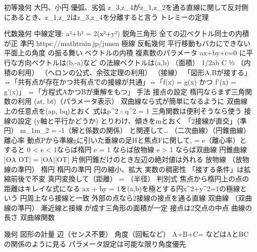 \documentclass[dvipdfmx,uplatex]{jsarticle}
\begin{document}
初等幾何
大円、小円
優弧、劣弧
z_3,z_4がz_1,z_2を通る直線に関して反対側にあるとき、z_1,z_2はz_3,z_4を分離すると言う
トレミーの定理

代数幾何
中線定理: a²+b² = 2(x²+y²)
鋭角三角形
全ての辺ベクトル同士の内積が正
準円
https://mathtrain.jp/junen
極線
反転幾何
平行移動もバカにできない
平面上の角度
\tan の振る舞い
ベクトルの内積
複素数のパラメータ
ax+by+c=0
に平行な方向ベクトルは(b,-a)など
の法線ベクトルは(a,b)
（面積）
1/2ab \sin C
½  （内積の利用）
 （ヘロンの公式、余弦定理の利用）
（接線）
「図形A,Bが接する」
⇔「共有点が存在かつ共有点での接線が共通」⇔「f(x) = g(x) かつ f’(x) = g’(x)」
⇔「方程式AかつBが重解をもつ」
手法
接点の設定
楕円ならまず三角関数の利用
(a\cos t, b\sin t)（パラメータ表示）
双曲線なら式が簡単になるように
双曲線上の任意点を(ap, bq)とおく
式はp^2 - q^2 = 1
三角関数は便利そうなら使う
接線の設定 (y軸と平行かどうか)
とりわけ、傾きをmとおく
「2接線が直交」（準円）
m_1m_2 = -1（解と係数の関係）
\tan と関連して…
（二次曲線）（円錐曲線）
離心率
動点Pから準線gに引いた垂線の足Hと焦点Fに関して, = e（離心率）とすると
0 < e < 1ならば楕円
e = 1 ならば放物線
e > 1 ならば双曲線  
円錐曲線
|OA \cdot OT| = |OA||OT| \cos \theta
片側円錐だけのとき左辺の絶対値は外れる
放物線
（放物線の準円）
楕円
楕円の準円
円の縮小、拡大
実数の稠密性
「接する条件」は拡縮前後で不変
真円変換して（距離） = （半径）
判別式
焦点から楕円上の点の距離はキレイな式になる
ax + by = 1を(a,b)を極とする円x^2+y^2=1の極線という
円周上なら接線と一致
外部の点なら2接線の接点を通る直線
双曲線
（双曲線の準円）
漸近線と接線
が成す三角形の面積が一定
接点は2交点の中点
曲線の長さ
\int {}
双曲線関数

幾何
図形の計量
辺（センス不要）
角度（回転など）
A+B+C= \pi などはAとBCの関係のように見る
パラメータ設定は可能な限り角度優先
\end{document}
